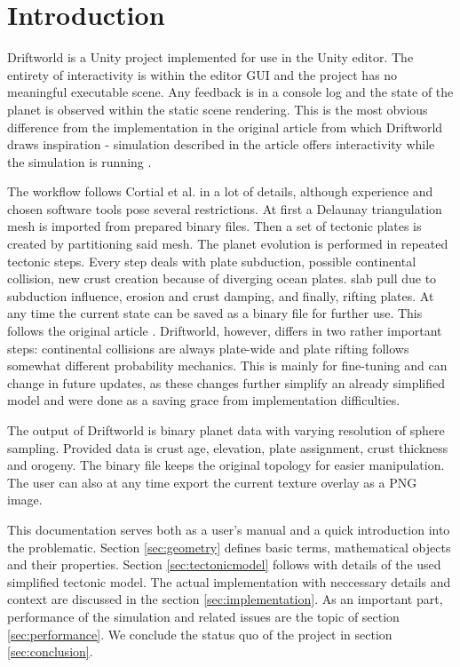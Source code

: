 \section{Introduction}
\label{sec:introduction}
Driftworld is a Unity project implemented for use in the Unity editor. The entirety of interactivity is within the editor GUI and the project has no meaningful executable scene. Any feedback is in a console log and the state of the planet is observed within the static scene rendering. This is the most obvious difference from the implementation in the original article from which Driftworld draws inspiration - simulation described in the article offers interactivity while the simulation is running \cite{cortial}.

The workflow follows Cortial et al. in a lot of details, although experience and chosen software tools pose several restrictions. At first a Delaunay triangulation mesh is imported from prepared binary files. Then a set of tectonic plates is created by partitioning said mesh. The planet evolution is performed in repeated tectonic steps. Every step deals with plate subduction, possible continental collision, new crust creation because of diverging ocean plates. slab pull due to subduction influence, erosion and crust damping, and finally, rifting plates. At any time the current state can be saved as a binary file for further use. This follows the original article \cite{cortial}. Driftworld, however, differs in two rather important steps: continental collisions are always plate-wide and plate rifting follows somewhat different probability mechanics. This is mainly for fine-tuning and can change in future updates, as these changes further simplify an already simplified model and were done as a saving grace from implementation difficulties.

The output of Driftworld is binary planet data with varying resolution of sphere sampling. Provided data is crust age, elevation, plate assignment, crust thickness and orogeny. The binary file keeps the original topology for easier manipulation. The user can also at any time export the current texture overlay as a PNG image.

This documentation serves both as a user's manual and a quick introduction into the problematic. Section \ref{sec:geometry} defines basic terms, mathematical objects and their properties. Section \ref{sec:tectonicmodel} follows with details of the used simplified tectonic model. The actual implementation with neccessary details and context are discussed in the section \ref{sec:implementation}. As an important part, performance of the simulation and related issues are the topic of section \ref{sec:performance}. We conclude the status quo of the project in section \ref{sec:conclusion}.

